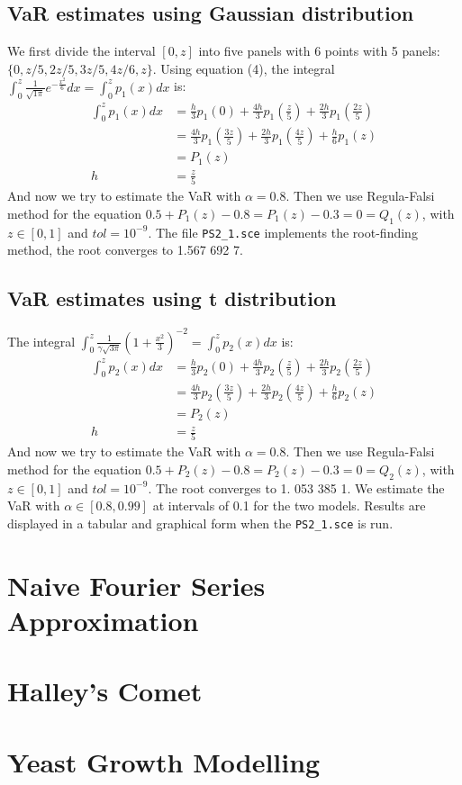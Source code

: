 \documentclass[10pt, twocolumn]{article}
\begin{document}
		\subsection{VaR estimates using Gaussian distribution}
		We first divide the interval $[0, z]$ into five panels with 6 points with 5 panels: $\{0, z/5, 2z/5, 3z/5, 4z/6, z\}$.
		Using equation (4), the integral $\int_{0}^{z}\frac{1}{\sqrt{1\pi}}e^{-\frac{x^2}{6}}dx = \int_{0}^{z}p_1(x)dx$ is:
		$$
		\begin{aligned}
			\int_{0}^{z}p_1(x)dx &= \frac{h}{3}p_1(0) + \frac{4h}{3}p_1\left(\frac{z}{5}\right) + \frac{2h}{3}p_1\left(\frac{2z}{5}\right)\\
				&= \frac{4h}{3}p_1\left(\frac{3z}{5}\right) + \frac{2h}{3}p_1\left(\frac{4z}{5}\right) + \frac{h}{6}p_1(z)\\
				&= P_1(z)\\
				h &= \frac{z}{5}
		\end{aligned}
		$$
		And now we try to estimate the VaR with $\alpha=0.8$.
		Then we use Regula-Falsi method for the equation $0.5 + P_1(z) - 0.8 = P_1(z)-0.3=0=Q_1(z)$, with $z\in[0,1]$ and $tol=10^{-9}$.
		The file \texttt{PS2\_1.sce} implements the root-finding method, the root converges to 1.567 692 7.
		
		\subsection{VaR estimates using t distribution}
		The integral $\int_{0}^{z}\frac{1}{\gamma\sqrt{3\pi}}\left(1+\frac{x^2}{3}\right)^{-2} = \int_{0}^{z}p_2(x)dx$ is:
		$$
		\begin{aligned}
			\int_{0}^{z}p_2(x)dx &= \frac{h}{3}p_2(0) + \frac{4h}{3}p_2\left(\frac{z}{5}\right) + \frac{2h}{3}p_2\left(\frac{2z}{5}\right)\\
				&= \frac{4h}{3}p_2\left(\frac{3z}{5}\right) + \frac{2h}{3}p_2\left(\frac{4z}{5}\right) + \frac{h}{6}p_2(z)\\
				&= P_2(z)\\
				h &= \frac{z}{5}
		\end{aligned}
		$$
		And now we try to estimate the VaR with $\alpha=0.8$.
		Then we use Regula-Falsi method for the equation $0.5 + P_2(z) - 0.8 = P_2(z)-0.3=0=Q_2(z)$, with $z\in[0,1]$ and $tol=10^{-9}$.
		The root converges to 1. 053 385 1.
		We estimate the VaR with $\alpha\in[0.8, 0.99]$ at intervals of 0.1 for the two models.
		Results are displayed in a tabular and graphical form when the \texttt{PS2\_1.sce} is run.
		
	\section{Naive Fourier Series Approximation}
	\section{Halley's Comet}
	\section{Yeast Growth Modelling}
\end{document}
